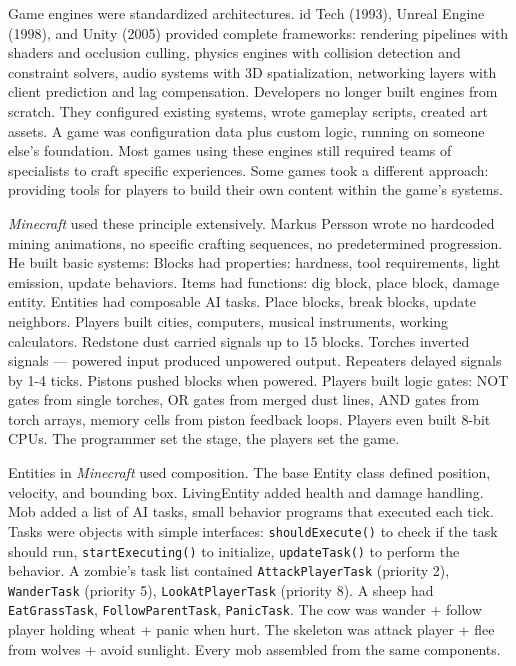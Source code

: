 Game engines were standardized architectures. id Tech (1993), Unreal Engine (1998), and Unity (2005) provided complete frameworks: rendering pipelines with shaders and occlusion culling, physics engines with collision detection and constraint solvers, audio systems with 3D spatialization, networking layers with client prediction and lag compensation. Developers no longer built engines from scratch. They configured existing systems, wrote gameplay scripts, created art assets.  A game was configuration data plus custom logic, running on someone else's foundation. Most games using these engines still required teams of specialists to craft specific experiences. Some games took a different approach: providing tools for players to build their own content within the game's systems.

\emph{Minecraft} used these principle extensively. Markus Persson wrote no hardcoded mining animations, no specific crafting sequences, no predetermined progression. He built basic systems: Blocks had properties: hardness, tool requirements, light emission, update behaviors. Items had functions: dig block, place block, damage entity. Entities had composable AI tasks.  Place blocks, break blocks, update neighbors. Players built cities, computers, musical instruments, working calculators. Redstone dust carried signals up to 15 blocks. Torches inverted signals — powered input produced unpowered output. Repeaters delayed signals by 1-4 ticks. Pistons pushed blocks when powered. Players built logic gates: NOT gates from single torches, OR gates from merged dust lines, AND gates from torch arrays, memory cells from piston feedback loops.  Players even built 8-bit CPUs. The programmer set the stage, the players set the game.

Entities in \emph{Minecraft} used composition. The base Entity class defined position, velocity, and bounding box. LivingEntity added health and damage handling. Mob added a list of AI tasks, small behavior programs that executed each tick. Tasks were objects with simple interfaces: \texttt{shouldExecute()} to check if the task should run, \texttt{startExecuting()} to initialize, \texttt{updateTask()} to perform the behavior. A zombie's task list contained \texttt{AttackPlayerTask} (priority 2), \texttt{WanderTask} (priority 5), \texttt{LookAtPlayerTask} (priority 8). A sheep had \texttt{EatGrassTask}, \texttt{FollowParentTask}, \texttt{PanicTask}.  The cow was wander + follow player holding wheat + panic when hurt. The skeleton was attack player + flee from wolves + avoid sunlight. Every mob assembled from the same components.

